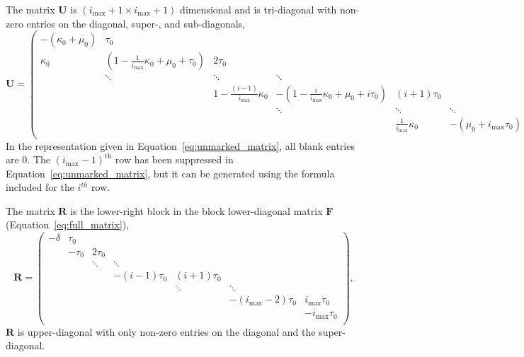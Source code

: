 \documentclass[review]{elsarticle}
\newcommand{\imax}{\ensuremath{i_{\max}}\xspace}
\let\bs\boldsymbol
\begin{document}
The matrix $\bs{U}$ is $(\imax+1\times \imax+1)$ dimensional and is tri-diagonal with non-zero entries on the diagonal, super-, and sub-diagonals,
\begin{equation}
\label{eq:unmarked_matrix}
\bs{U}=\left(\begin{array}{cccccc}
-(\kappa_0+\mu_0) & \tau_0 &  &  &  & \\
\kappa_0 & \left(1-\frac{1}{\imax} \kappa_0+\mu_0+\tau_0\right) & 2\tau_0 &  &  & \\
   &\ddots        & \ddots        & \ddots & &  \\
   & &    1-\frac{(i-1)}{\imax}\kappa_0 & -\left(1-\frac{i}{\imax}\kappa_0+\mu_0+i\tau_0\right) & (i+1)\tau_0 & \\
                  &         &        & \ddots  & \ddots & \ddots \\
     
                          &        &  &  & \frac{1}{\imax}\kappa_0 & -\left(\mu_0+\imax\tau_0\right) \\
\end{array}\right).
\end{equation}
In the representation given in Equation~\ref{eq:unmarked_matrix}, all blank entries are 0.
The $(\imax-1)^{\text{th}}$ row has been suppressed in Equation~\ref{eq:unmarked_matrix}, but it can be generated using the formula included for the $i^{th}$ row.

The matrix $\bs{R}$ is the lower-right block in the block lower-diagonal matrix $\bs{F}$ (Equation~\ref{eq:full_matrix}),
\begin{equation}
\label{eq:marked_matrix}
\bs{R}=\left(
\begin{array}{ccccccc}
-\delta & \tau_0 & & & & & \\
 & -\tau_0 & 2\tau_0 & & & &\\
 & & \ddots & \ddots & & & \\
 & & & -(i-1)\tau_0 & (i+1)\tau_0 & & \\
 & & & & \ddots & \ddots & \\
 & & & & & -(\imax-2)\tau_0 & \imax\tau_0 \\
 & & & & & & -\imax\tau_0 \\
\end{array}
\right),
\end{equation}
$\bs{R}$ is upper-diagonal with only non-zero entries on the diagonal and the super-diagonal.
\end{document}
